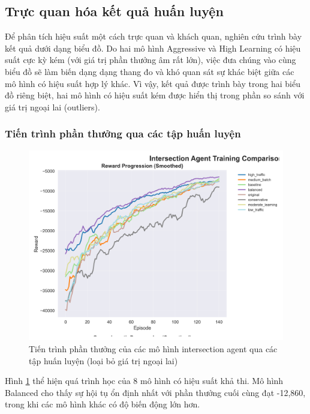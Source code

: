\subsection{Trực quan hóa kết quả huấn luyện}

Để phân tích hiệu suất một cách trực quan và khách quan, nghiên cứu trình bày
kết quả dưới dạng biểu đồ. Do hai mô hình Aggressive và High Learning có hiệu suất cực kỳ kém (với giá trị phần thưởng âm rất lớn), việc đưa chúng vào cùng biểu đồ sẽ làm biến dạng dạng thang đo và khó quan sát sự khác biệt giữa các mô hình có hiệu suất hợp lý khác. Vì vậy, kết quả được trình bày trong hai biểu đồ riêng biệt, hai mô hình có hiệu suất kém được hiển thị trong phần so sánh với giá trị ngoại lai (outliers).

\subsubsection{Tiến trình phần thưởng qua các tập huấn luyện}

\begin{figure}[!htp]
    \centering
    \includegraphics[width=\textwidth]{figures/individual_plots/intersection_filtered_reward_progress.png}
    \caption{Tiến trình phần thưởng của các mô hình intersection agent qua các tập huấn luyện (loại bỏ giá trị ngoại lai)}
    \label{fig:intersection_filtered_reward_progress}
\end{figure}

Hình \ref{fig:intersection_filtered_reward_progress} thể hiện quá trình học của
8 mô hình có hiệu suất khả thi. Mô hình Balanced cho thấy sự hội tụ ổn định nhất
với phần thưởng cuối cùng đạt -12,860, trong khi các mô hình khác có độ biến động lớn
hơn.

